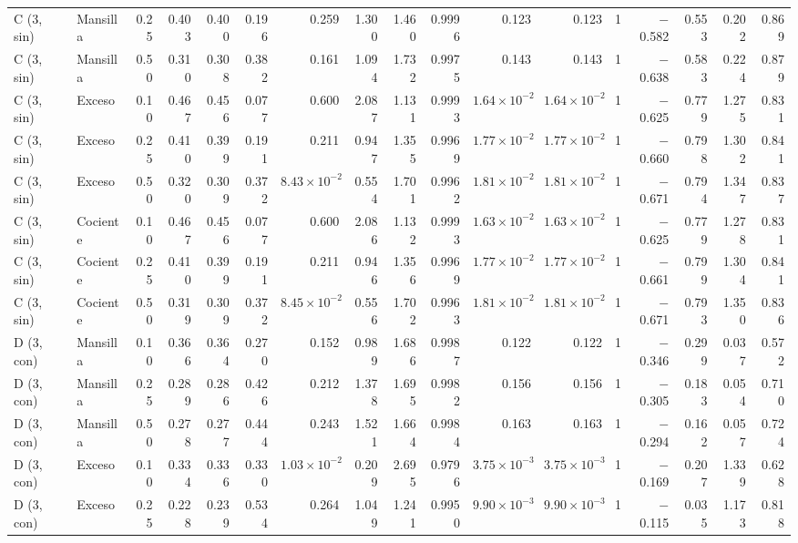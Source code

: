 \documentclass[11pt,letterpaper]{article}
\begin{document}
\begin{landscape}
\begin{scriptsize}
\begin{longtable}{llrrrrrrrrrrrrrrr}
C (3, sin) & Mansilla & 0.25 & 0.403 & 0.400 & 0.196 & 0.259 & 1.300 & 1.460 & 0.9996 & 0.123 & 0.123 & 1 & $-$0.582 & 0.553 & 0.202 & 0.869 \\
C (3, sin) & Mansilla & 0.50 & 0.310 & 0.308 & 0.382 & 0.161 & 1.094 & 1.732 & 0.9975 & 0.143 & 0.143 & 1 & $-$0.638 & 0.583 & 0.224 & 0.879 \\
C (3, sin) & Exceso & 0.10 & 0.467 & 0.456 & 0.077 & 0.600 & 2.087 & 1.131 & 0.9993 & $1.64\times10^{-2}$ & $1.64\times10^{-2}$ & 1 & $-$0.625 & 0.779 & 1.275 & 0.831 \\
C (3, sin) & Exceso & 0.25 & 0.410 & 0.399 & 0.191 & 0.211 & 0.947 & 1.355 & 0.9969 & $1.77\times10^{-2}$ & $1.77\times10^{-2}$ & 1 & $-$0.660 & 0.798 & 1.302 & 0.841 \\
C (3, sin) & Exceso & 0.50 & 0.320 & 0.309 & 0.372 & $8.43\times10^{-2}$ & 0.554 & 1.701 & 0.9962 & $1.81\times10^{-2}$ & $1.81\times10^{-2}$ & 1 & $-$0.671 & 0.794 & 1.347 & 0.837 \\
C (3, sin) & Cociente & 0.10 & 0.467 & 0.456 & 0.077 & 0.600 & 2.086 & 1.132 & 0.9993 & $1.63\times10^{-2}$ & $1.63\times10^{-2}$ & 1 & $-$0.625 & 0.779 & 1.278 & 0.831 \\
C (3, sin) & Cociente & 0.25 & 0.410 & 0.399 & 0.191 & 0.211 & 0.946 & 1.356 & 0.9969 & $1.77\times10^{-2}$ & $1.77\times10^{-2}$ & 1 & $-$0.661 & 0.799 & 1.304 & 0.841 \\
C (3, sin) & Cociente & 0.50 & 0.319 & 0.309 & 0.372 & $8.45\times10^{-2}$ & 0.556 & 1.702 & 0.9963 & $1.81\times10^{-2}$ & $1.81\times10^{-2}$ & 1 & $-$0.671 & 0.793 & 1.350 & 0.836 \\
D (3, con) & Mansilla & 0.10 & 0.366 & 0.364 & 0.270 & 0.152 & 0.989 & 1.686 & 0.9987 & 0.122 & 0.122 & 1 & $-$0.346 & 0.299 & 0.037 & 0.572 \\
D (3, con) & Mansilla & 0.25 & 0.289 & 0.286 & 0.426 & 0.212 & 1.378 & 1.695 & 0.9982 & 0.156 & 0.156 & 1 & $-$0.305 & 0.183 & 0.054 & 0.710 \\
D (3, con) & Mansilla & 0.50 & 0.278 & 0.277 & 0.444 & 0.243 & 1.521 & 1.664 & 0.9984 & 0.163 & 0.163 & 1 & $-$0.294 & 0.162 & 0.057 & 0.724 \\
D (3, con) & Exceso & 0.10 & 0.334 & 0.336 & 0.330 & $1.03\times10^{-2}$ & 0.209 & 2.695 & 0.9796 & $3.75\times10^{-3}$ & $3.75\times10^{-3}$ & 1 & $-$0.169 & 0.207 & 1.339 & 0.628 \\
D (3, con) & Exceso & 0.25 & 0.228 & 0.239 & 0.534 & 0.264 & 1.049 & 1.241 & 0.9950 & $9.90\times10^{-3}$ & $9.90\times10^{-3}$ & 1 & $-$0.115 & 0.035 & 1.173 & 0.818 \\

\end{longtable}
\end{scriptsize}
\end{landscape}
\end{document}
